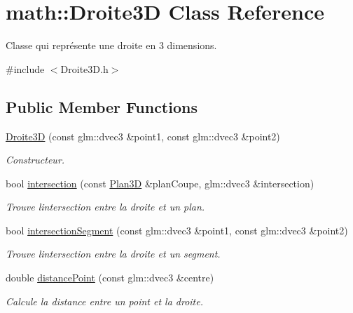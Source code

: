 \hypertarget{classmath_1_1_droite3_d}{}\section{math\+:\+:Droite3\+D Class Reference}
\label{classmath_1_1_droite3_d}


Classe qui représente une droite en 3 dimensions.  




{\ttfamily \#include $<$Droite3\+D.\+h$>$}

\subsection*{Public Member Functions}
\begin{DoxyCompactItemize}
\item 
\hyperlink{classmath_1_1_droite3_d_a9248463117b4567a6e68a88f5760f07a}{Droite3\+D} (const glm\+::dvec3 \&point1, const glm\+::dvec3 \&point2)
\begin{DoxyCompactList}\small\item\em Constructeur. \end{DoxyCompactList}\item 
bool \hyperlink{classmath_1_1_droite3_d_acec61f69291777c83e5539fedb83b170}{intersection} (const \hyperlink{classmath_1_1_plan3_d}{Plan3\+D} \&plan\+Coupe, glm\+::dvec3 \&intersection)
\begin{DoxyCompactList}\small\item\em Trouve l\textquotesingle{}intersection entre la droite et un plan. \end{DoxyCompactList}\item 
bool \hyperlink{classmath_1_1_droite3_d_a537d2c35e8ae11d2968087599b10c752}{intersection\+Segment} (const glm\+::dvec3 \&point1, const glm\+::dvec3 \&point2)
\begin{DoxyCompactList}\small\item\em Trouve l\textquotesingle{}intersection entre la droite et un segment. \end{DoxyCompactList}\item 
double \hyperlink{classmath_1_1_droite3_d_a92d2f79fc5d29ddd8061ebb632293f04}{distance\+Point} (const glm\+::dvec3 \&centre)
\begin{DoxyCompactList}\small\item\em Calcule la distance entre un point et la droite. \end{DoxyCompactList}\item 

\end{DoxyCompactItemize}
